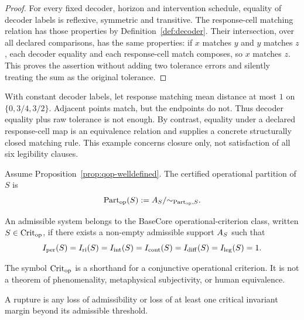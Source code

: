 \begin{proof}
For every fixed decoder, horizon and intervention schedule, equality of decoder labels is reflexive, symmetric and transitive. The response-cell matching relation has those properties by Definition~\ref{def:decoder}. Their intersection, over all declared comparisons, has the same properties: if $x$ matches $y$ and $y$ matches $z$, each decoder equality and each response-cell match composes, so $x$ matches $z$. This proves the assertion without adding two tolerance errors and silently treating the sum as the original tolerance.
\end{proof}

\begin{remark}\label{rem:tolerance-control}
With constant decoder labels, let response matching mean distance at most $1$ on $\{0,3/4,3/2\}$. Adjacent points match, but the endpoints do not. Thus decoder equality plus raw tolerance is not enough. By contrast, equality under a declared response-cell map is an equivalence relation and supplies a concrete structurally closed matching rule. This example concerns closure only, not satisfaction of all six legibility clauses.
\end{remark}

\begin{definition}\label{def:qop}
Assume Proposition~\ref{prop:qop-welldefined}. The certified operational partition of $S$ is
\[
\mathrm{Part}_{\mathrm{op}}(S):=A_S/{\sim_{\mathrm{Part}_{\mathrm{op}},S}}.
\]
\end{definition}

\begin{definition}\label{def:cop}
An admissible system belongs to the BaseCore operational-criterion class, written $S\in\mathrm{Crit}_{\mathrm{op}}$, if there exists a non-empty admissible support $A_S$ such that
\[
I_{\mathrm{per}}(S)=I_{\mathrm{ri}}(S)=I_{\mathrm{int}}(S)=I_{\mathrm{cont}}(S)=I_{\mathrm{diff}}(S)=I_{\mathrm{leg}}(S)=1.
\]
\end{definition}

\begin{remark}
The symbol $\mathrm{Crit}_{\mathrm{op}}$ is a shorthand for a conjunctive operational criterion. It is not a theorem of phenomenality, metaphysical subjectivity, or human equivalence.
\end{remark}

\begin{definition}[Rupture]\label{def:rupture}
A rupture is any loss of admissibility or loss of at least one critical invariant margin beyond its admissible threshold.
\end{definition}

